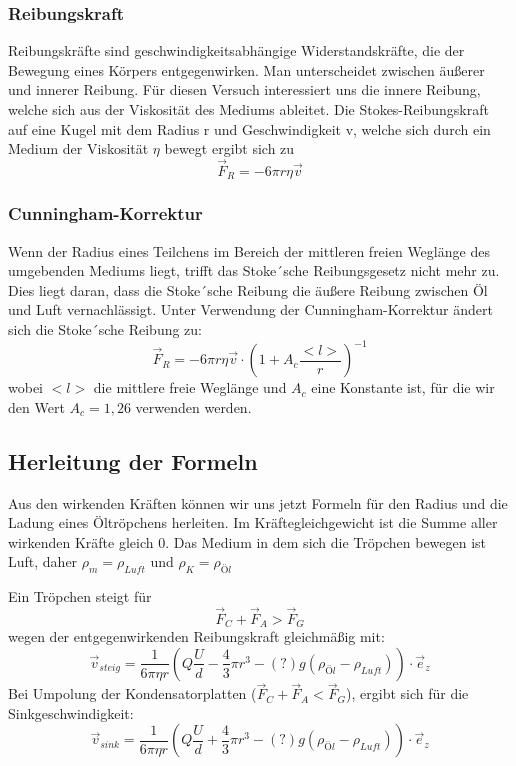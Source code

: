 \documentclass{scrartcl}
\begin{document}
		\subsubsection{Reibungskraft}
			Reibungskräfte sind geschwindigkeitsabhängige Widerstandskräfte, die der Bewegung eines Körpers entgegenwirken.
			Man unterscheidet zwischen äußerer und innerer Reibung. Für diesen Versuch interessiert uns die innere Reibung, welche sich aus der Viskosität des Mediums ableitet.
			Die Stokes-Reibungskraft auf eine Kugel mit dem Radius r und Geschwindigkeit v, welche sich durch ein Medium der Viskosität $\eta$ bewegt ergibt sich zu
			\begin{equation}
				\vec{F}_R = -6 \pi r \eta \vec{v}
			\end{equation}
		\subsubsection{Cunningham-Korrektur}
			Wenn der Radius eines Teilchens im Bereich der mittleren freien Weglänge des umgebenden Mediums liegt, trifft das Stoke´sche Reibungsgesetz nicht mehr zu.
			Dies liegt daran, dass die Stoke´sche Reibung die äußere Reibung zwischen Öl und Luft vernachlässigt.
			Unter Verwendung der Cunningham-Korrektur ändert sich die Stoke´sche Reibung zu:
			\begin{equation}
				\vec{F}_R = -6 \pi r \eta \vec{v} \cdot (1 + A_c \frac{<l>}{r})^{-1}
			\end{equation}
			wobei $<l>$ die mittlere freie Weglänge und $A_c$ eine Konstante ist, für die wir den Wert $A_c = 1,26$ verwenden werden.
		\subsection{Herleitung der Formeln}
			Aus den wirkenden Kräften können wir uns jetzt Formeln für den Radius und die Ladung eines Öltröpchens herleiten.
			Im Kräftegleichgewicht ist die Summe aller wirkenden Kräfte gleich 0.
			Das Medium in dem sich die Tröpchen bewegen ist Luft, daher	$\rho_m  = \rho_{Luft}$ und $\rho_K = \rho_{Öl}$

			Ein Tröpchen steigt für
			\begin{equation}
				\vec{F}_C + \vec{F}_A > \vec{F}_G
			\end{equation}
			wegen der entgegenwirkenden  Reibungskraft gleichmäßig mit:
			\begin{equation}
				\vec{v}_{steig} = \frac{1}{6\pi \eta r} (Q \frac{U}{d} - \frac{4}{3}\pi r^3 -(?)g (\rho_{Öl}-\rho_{Luft})) \cdot \vec{e}_z
			\end{equation}
			Bei Umpolung der Kondensatorplatten ($\vec{F}_C + \vec{F}_A < \vec{F}_G$), ergibt sich für die Sinkgeschwindigkeit:
			\begin{equation}
				\vec{v}_{sink} = \frac{1}{6\pi \eta r} (Q \frac{U}{d} + \frac{4}{3}\pi r^3 -(?)g (\rho_{Öl}-\rho_{Luft})) \cdot \vec{e}_z
			\end{equation}
\end{document}
